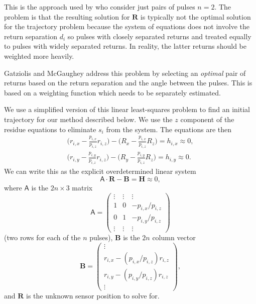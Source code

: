 \documentclass
[rmp,reprint,
twocolumn,amsmath,showkeys,letterpaper,raggedbottom]{revtex4-2}
\begin{document}
This is the approach used by \citet{gatziolis19} who consider just pairs
of pulses $n = 2$.  The problem is that the resulting solution for
$\mathbf R$ is typically not the optimal solution for the trajectory
problem because the system of equations does not involve the return
separation $d_i$ so pulses with closely separated returns and treated
equally to pulses with widely separated returns.  In reality, the latter
returns should be weighted more heavily.

Gatziolis and McGaughey address this problem by selecting an {\it optimal}
pair of returns based on the return separation and the angle between
the pulses.  This is based on a weighting function which needs to be
separately estimated.

We use a simplified version of this linear least-squares problem to
find an initial trajectory for our method described below.  We use the
$z$ component of the residue equations to eliminate $s_i$ from the
system.  The equations are then
\begin{align*}
\biggl( r_{i,x} - \frac{p_{i,x}}{p_{i,z}} r_{i,z} \biggr) -
\biggl( R_x - \frac{p_{i,x}}{p_{i,z}} R_z \biggr) = h_{i,x} \approx 0, \\
\biggl( r_{i,y} - \frac{p_{i,y}}{p_{i,z}} r_{i,z} \biggr) -
\biggl( R_y - \frac{p_{i,y}}{p_{i,z}} R_z \biggr) = h_{i,y} \approx 0.
\end{align*}
We can write this as the explicit overdetermined linear system
\begin{equation}
\mathsf A \cdot \mathbf R - \mathbf B = \mathbf H \approx 0,
\end{equation}
where $\mathsf A$ is the $2n \times 3$ matrix
\begin{equation}
\mathsf A = \begin{pmatrix}
\vdots & \vdots & \vdots \\
1 & 0 & - p_{i,x}/p_{i,z} \\
0 & 1 & - p_{i,y}/p_{i,z} \\
\vdots & \vdots & \vdots
\end{pmatrix}
\end{equation}
(two rows for each of the $n$ pulses), $\mathbf B$ is the $2n$
column vector
\begin{equation}
\mathbf B = \begin{pmatrix}
\vdots \\
r_{i,x} - (p_{i,x}/p_{i,z}) r_{i,z} \\
r_{i,y} - (p_{i,y}/p_{i,z}) r_{i,z} \\
\vdots
\end{pmatrix},
\end{equation}
and $\mathbf R$ is the unknown sensor position to solve for.
\end{document}
